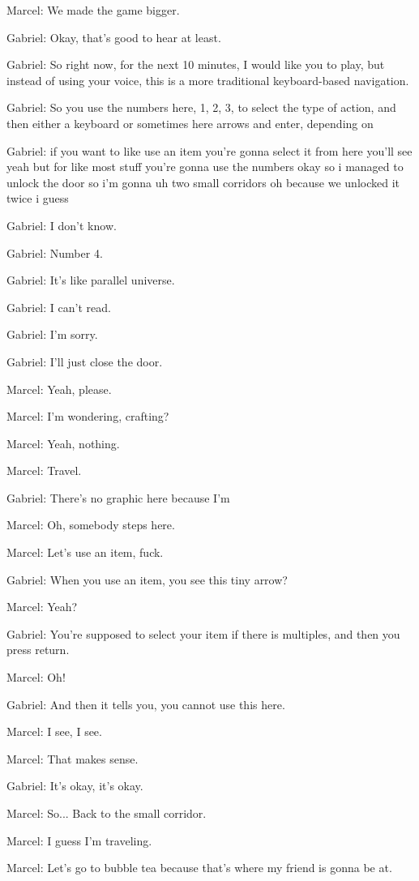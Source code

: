 Marcel: We made the game bigger.

Gabriel: Okay, that's good to hear at least.

Gabriel: So right now, for the next 10 minutes, I would like you to play, but instead of using your voice, this is a more traditional keyboard-based navigation.

Gabriel: So you use the numbers here, 1, 2, 3, to select the type of action, and then either a keyboard or sometimes here arrows and enter, depending on

Gabriel: if you want to like use an item you're gonna select it from here you'll see yeah but for like most stuff you're gonna use the numbers okay so i managed to unlock the door so i'm gonna uh two small corridors oh because we unlocked it twice i guess

Gabriel: I don't know.

Gabriel: Number 4.

Gabriel: It's like parallel universe.

Gabriel: I can't read.

Gabriel: I'm sorry.

Gabriel: I'll just close the door.

Marcel: Yeah, please.

Marcel: I'm wondering, crafting?

Marcel: Yeah, nothing.

Marcel: Travel.

Gabriel: There's no graphic here because I'm

Marcel: Oh, somebody steps here.

Marcel: Let's use an item, fuck.

Gabriel: When you use an item, you see this tiny arrow?

Marcel: Yeah?

Gabriel: You're supposed to select your item if there is multiples, and then you press return.

Marcel: Oh!

Gabriel: And then it tells you, you cannot use this here.

Marcel: I see, I see.

Marcel: That makes sense.

Gabriel: It's okay, it's okay.

Marcel: So... Back to the small corridor.

Marcel: I guess I'm traveling.

Marcel: Let's go to bubble tea because that's where my friend is gonna be at.

